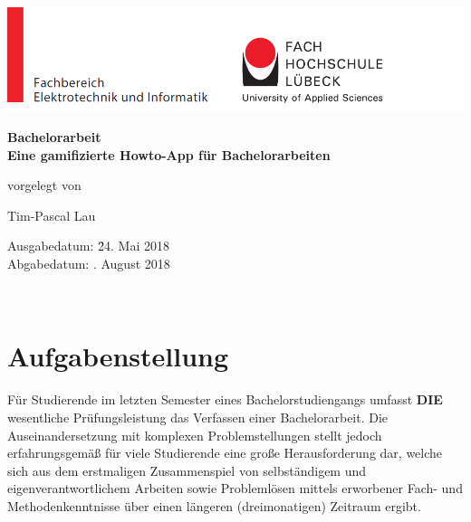 \documentclass[bibliography=totoc,listof=totoc,BCOR=5mm,DIV=12,oneside]{scrbook}
\begin{document}
\frontmatter
    \pagestyle{empty}
\thispagestyle{empty}

\begin{center}

\vspace*{-2cm}

\includegraphics[width=1.2\textwidth]{Bilder/Form/fhl_logo.png}

\vspace*{3cm}
{\Large \textbf{Bachelorarbeit}}\\

\vspace{2.0cm}
{\Huge \textbf{Eine gamifizierte Howto-App für Bachelorarbeiten}}\\
\vspace*{3mm}

\vspace{1.5cm}

vorgelegt von
\vspace{1.5cm}

{\LARGE Tim-Pascal Lau} %
\vspace{2cm}

\parbox{1cm}{
\begin{large}
\begin{tabbing}
Ausgabedatum: \hspace{.5cm} \=24. Mai 2018\\
Abgabedatum: . August 2018\\
\end{tabbing}
\end{large}}\\
\vspace{5mm}
\end{center}

\newpage
\chapter*{Aufgabenstellung}
\par Für Studierende im letzten Semester eines Bachelorstudiengangs umfasst \textbf{DIE} wesentliche Prüfungsleistung das Verfassen einer Bachelorarbeit.
Die Auseinandersetzung mit komplexen Problemstellungen stellt jedoch erfahrungsgemäß für viele Studierende eine große Herausforderung dar, welche sich aus dem erstmaligen Zusammenspiel von selbständigem und eigenverantwortlichem Arbeiten sowie Problemlösen mittels erworbener Fach- und Methodenkenntnisse über einen längeren (dreimonatigen) Zeitraum ergibt.
\end{document}
